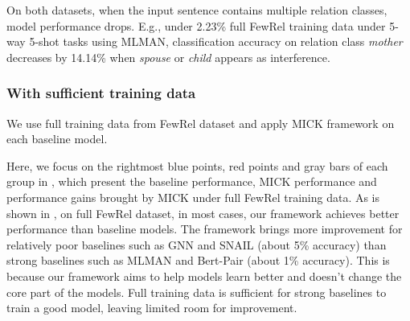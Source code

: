 On both datasets, when the input sentence contains multiple relation classes, model performance drops. E.g., under 2.23\% full FewRel training data under 5-way 5-shot tasks using MLMAN, classification accuracy on relation class \emph{mother} decreases by 14.14\% when \emph{spouse} or \emph{child} appears as interference.

\subsubsection{With sufficient training data}

We use full training data from FewRel dataset and apply MICK framework on each baseline model.

Here, we focus on the rightmost blue points, red points and gray bars of each group in , which present the baseline performance, MICK performance and performance gains brought by MICK under full FewRel training data. As is shown in , on full FewRel dataset, in most cases, our framework achieves better performance than baseline models.
The framework brings more improvement for relatively poor baselines such as GNN and SNAIL (about 5\% accuracy) than strong baselines such as MLMAN and Bert-Pair (about 1\% accuracy). This is because our framework aims to help models learn better and doesn't change the core part of the models. Full training data is sufficient for strong baselines to train a good model, leaving limited room for improvement. 







